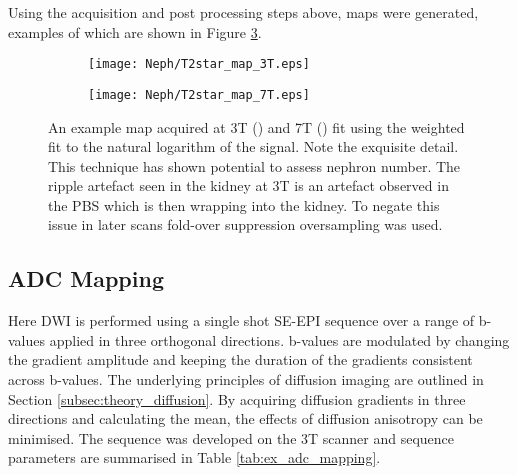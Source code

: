\newpage
Using the acquisition and post processing steps above, \ttwostar maps were generated, examples of which are shown in Figure \ref{fig:ex_t2star_maps}.

\begin{figure}[H]
	\centering
	\begin{subfigure}[c]{0.47\textwidth}
		\centering
		\texttt{[image: Neph/T2star\_map\_3T.eps]}
		\caption{}
		\label{fig:ex_t2star_map_3t}
	\end{subfigure}
	\hfill
	\begin{subfigure}[c]{0.47\textwidth}
		\centering
		\texttt{[image: Neph/T2star\_map\_7T.eps]}
		\caption{}
		\label{fig:ex_t2star_map_7t}
	\end{subfigure}
	\caption{An example \ttwostar map acquired at 3T () and 7T () fit using the weighted fit to the natural logarithm of the signal. Note the exquisite detail. This technique has shown potential to assess nephron number. The ripple artefact seen in the kidney at 3T is an artefact observed in the \ac{PBS} which is then wrapping into the kidney. To negate this issue in later scans fold-over suppression oversampling was used.}
	\label{fig:ex_t2star_maps}
\end{figure}

\subsection{\acl*{ADC} Mapping}
\label{subsec:ex_adc}

Here \ac{DWI} is performed using a single shot \ac{SE}-\ac{EPI} sequence over a range of b-values applied in three orthogonal directions. b-values are modulated by changing the gradient amplitude and keeping the duration of the gradients consistent across b-values. The underlying principles of diffusion imaging are outlined in Section \ref{subsec:theory_diffusion}. By acquiring diffusion gradients in three directions and calculating the mean, the effects of diffusion anisotropy can be minimised. The sequence was developed on the 3T scanner and sequence parameters are summarised in Table \ref{tab:ex_adc_mapping}. 

